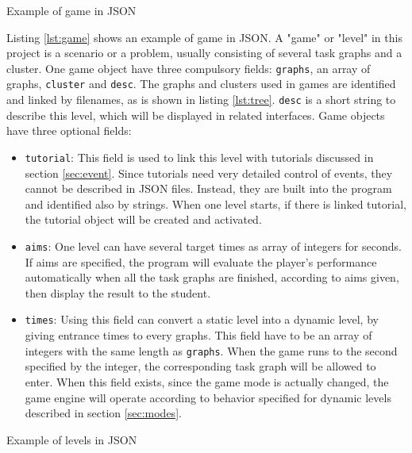 \documentclass[msc,deptreport, cs]{infthesis}
\begin{document}
\vspace{0.5em}
\begin{lstfloat}
  
  \caption{Example of game in JSON}
  \label{lst:game}
  \vspace{-1em}
\end{lstfloat}
\vspace{-0.5em}

Listing \ref{lst:game} shows an example of game in JSON. A "game" or "level" in this project is a scenario or a problem, usually consisting of several task graphs and a cluster. One game object have three compulsory fields: \verb+graphs+, an array of graphs, \verb+cluster+ and \verb+desc+. The graphs and clusters used in games are identified and linked by filenames, as is shown in listing \ref{lst:tree}. \verb+desc+ is a short string to describe this level, which will be displayed in related interfaces. Game objects have three optional fields:
\begin{itemize}
  \item \verb+tutorial+: This field is used to link this level with tutorials discussed in section \ref{sec:event}. Since tutorials need very detailed control of events, they cannot be described in JSON files. Instead, they are built into the program and identified also by strings. When one level starts, if there is linked tutorial, the tutorial object will be created and activated.
  \item \verb+aims+: One level can have several target times as array of integers for seconds. If aims are specified, the program will evaluate the player's performance automatically when all the task graphs are finished, according to aims given, then display the result to the student.
  \item \verb+times+: Using this field can convert a static level into a dynamic level, by giving entrance times to every graphs. This field have to be an array of integers with the same length as \verb+graphs+. When the game runs to the second specified by the integer, the corresponding task graph will be allowed to enter. When this field exists, since the game mode is actually changed, the game engine will operate according to behavior specified for dynamic levels described in section \ref{sec:modes}.
\end{itemize}

\vspace{0.5em}
\begin{lstfloat}
  
  \caption{Example of levels in JSON}
  \label{lst:levels}
  \vspace{-1em}
\end{lstfloat}
\vspace{-0.5em}
\end{document}
